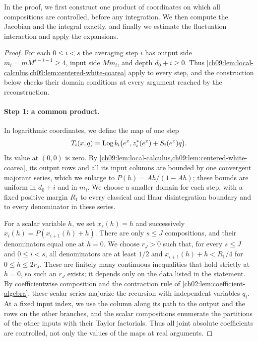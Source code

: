 In the proof, we first construct one product of coordinates on which all compositions are controlled, before any integration. We then compute the Jacobian and the integral exactly, and finally we estimate the fluctuation interaction and apply the expansions.

\begin{proof}
For each $0\le i<s$ the averaging step $i$ has output side $m_i=mM^{s-i-1}\ge4$, input side $Mm_i$, and depth $d_0+i\ge0$. Thus \cref{ch09:lem:local-calculus,ch09:lem:centered-white-coarea} apply to every step, and the construction below checks their domain conditions at every argument reached by the reconstruction.

\paragraph{Step 1: a common product.}
In logarithmic coordinates, we define the map of one step
\[
 T_i(x,q)=\operatorname{Log} b_i\bigl(e^x,z_i^*(e^x)+S_i(e^x)q\bigr).
\]
Its value at $(0,0)$ is zero. By \cref{ch09:lem:local-calculus,ch09:lem:centered-white-coarea}, its output rows and all its input columns are bounded by one convergent majorant series, which we enlarge to $P(h)=Ah/(1-Ah)$; these bounds are uniform in $d_0+i$ and in $m_i$. We choose a smaller domain for each step, with a fixed positive margin $R_1$ to every classical and Haar disintegration boundary and to every denominator in these series.

For a scalar variable $h$, we set $x_s(h)=h$ and successively $x_i(h)=P(x_{i+1}(h)+h)$. There are only $s\le J$ compositions, and their denominators equal one at $h=0$. We choose $r_J>0$ such that, for every $s\le J$ and $0\le i<s$, all denominators are at least $1/2$ and $x_{i+1}(h)+h<R_1/4$ for $0\le h\le2r_J$. These are finitely many continuous inequalities that hold strictly at $h=0$, so such an $r_J$ exists; it depends only on the data listed in the statement. By coefficientwise composition and the contraction rule of \cref{ch02:lem:coefficient-algebra}, these scalar series majorize the recursion with independent variables $q_i$. At a fixed input index, we use the column along its path to the output and the rows on the other branches, and the scalar compositions enumerate the partitions of the other inputs with their Taylor factorials. Thus all joint absolute coefficients are controlled, not only the values of the maps at real arguments.


\end{proof}
